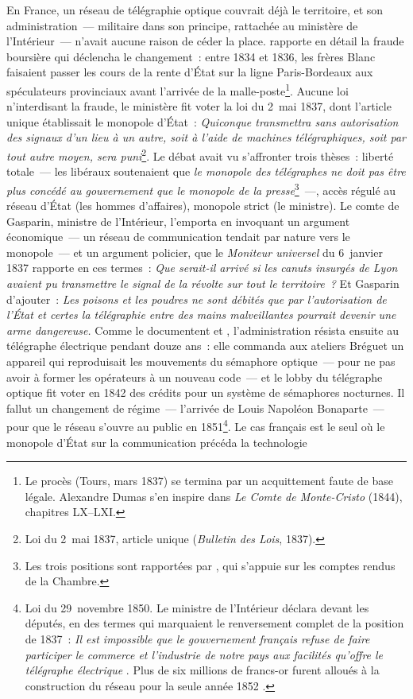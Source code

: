 %
En France, un réseau de télégraphie optique couvrait déjà le territoire, et son administration~--- militaire dans son principe, rattachée au ministère de l'Intérieur~--- n'avait aucune raison de céder la place. \textcite{ducamp_telegraphe_1869} rapporte en détail la fraude boursière qui déclencha le changement~: entre 1834 et 1836, les frères Blanc faisaient passer les cours de la rente d'État sur la ligne Paris-Bordeaux aux spéculateurs provinciaux avant l'arrivée de la malle-poste\footnote{Le procès (Tours, mars 1837) se termina par un acquittement faute de base légale. Alexandre Dumas s'en inspire dans \emph{Le Comte de Monte-Cristo} (1844), chapitres LX--LXI.}. Aucune loi n'interdisant la fraude, le ministère fit voter la loi du 2~mai 1837, dont l'article unique établissait le monopole d'État~: \og \emph{Quiconque transmettra sans autorisation des signaux d'un lieu à un autre, soit à l'aide de machines télégraphiques, soit par tout autre moyen, sera puni}\fg{}\footnote{Loi du 2~mai 1837, article unique (\emph{Bulletin des Lois}, 1837).}. Le débat avait vu s'affronter trois thèses~: liberté totale~--- les libéraux soutenaient que \og \emph{le monopole des télégraphes ne doit pas être plus concédé au gouvernement que le monopole de la presse}\fg{}\footnote{Les trois positions sont rapportées par \textcite[pp.~22--23]{bertho_histoire_1984}, qui s'appuie sur les comptes rendus de la Chambre.}~---, accès régulé au réseau d'État (les hommes d'affaires), monopole strict (le ministre). Le comte de Gasparin, ministre de l'Intérieur, l'emporta en invoquant un argument économique~--- un réseau de communication tendait par nature vers le monopole~--- et un argument policier, que le \emph{Moniteur universel} du 6~janvier 1837 rapporte en ces termes~: \og \emph{Que serait-il arrivé si les canuts insurgés de Lyon avaient pu transmettre le signal de la révolte sur tout le territoire~?}\fg{} Et Gasparin d'ajouter~: \og \emph{Les poisons et les poudres ne sont débités que par l'autorisation de l'État et certes la télégraphie entre des mains malveillantes pourrait devenir une arme dangereuse.}\fg{} Comme le documentent \textcite{ducamp_telegraphe_1869} et \textcite{belloc_telegraphie_1894}, l'administration résista ensuite au télégraphe électrique pendant douze ans~: elle commanda aux ateliers Bréguet un appareil qui reproduisait les mouvements du sémaphore optique~--- pour ne pas avoir à former les opérateurs à un nouveau code~--- et le lobby du télégraphe optique fit voter en 1842 des crédits pour un système de sémaphores nocturnes. Il fallut un changement de régime~--- l'arrivée de Louis Napoléon Bonaparte~--- pour que le réseau s'ouvre au public en 1851\footnote{Loi du 29~novembre 1850. Le ministre de l'Intérieur déclara devant les députés, en des termes qui marquaient le renversement complet de la position de 1837~: \og \emph{Il est impossible que le gouvernement français refuse de faire participer le commerce et l'industrie de notre pays aux facilités qu'offre le télégraphe électrique}\fg{} \parencite[p.~25]{bertho_histoire_1984}. Plus de six millions de francs-or furent alloués à la construction du réseau pour la seule année 1852 \parencite{ducamp_telegraphe_1869}.}. Le cas français est le seul où le monopole d'État sur la communication précéda la technologie 